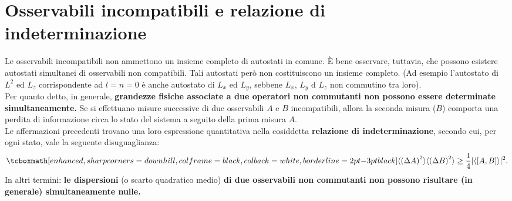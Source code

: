 \section[Osservabili incompatibili e relazione di indeterminazione]{Osservabili incompatibili e relazione di\\ indeterminazione}
Le osservabili incompatibili non ammettono un insieme completo di autostati in comune. È bene osservare, tuttavia, che possono esistere autostati simultanei di osservabili non compatibili. Tali autostati però non costituiscono un insieme completo. (Ad esempio l'autostato di $L^2$ ed $L_z$ corrispondente ad $l=n=0$ è anche autostato di $L_x$ ed $L_y$, sebbene $L_x$, $L_y$ d $L_z$ non commutino tra loro).\\

Per quanto detto, in generale, \textbf{grandezze fisiche associate a due operatori non commutanti non possono essere determinate simultaneamente.} Se si effettuano misure successive di due osservabili $A$ e $B$ incompatibili, allora la seconda misura ($B$) comporta una perdita di informazione circa lo stato del sistema a seguito della prima misura $A$.\\

Le affermazioni precedenti trovano una loro espressione quantitativa nella cosiddetta \textbf{relazione di indeterminazione}, secondo cui, per ogni stato, vale la seguente disuguaglianza:
	\begin{equation}
		\label{eq:cap4_2}
		\tcboxmath[enhanced, sharp corners=downhill, colframe=black, colback=white, borderline={2pt}{-3pt}{black}]{
			\langle \left( \Delta A \right) ^2 \rangle \langle \left( \Delta B \right) ^2 \rangle \geq\frac{1}{4}\vert \langle \left[A,B \right] \rangle \vert ^2.
			}
	\end{equation}
In altri termini: \textbf{le dispersioni} (o scarto quadratico medio) \textbf{di due osservabili non commutanti non possono risultare (in generale) simultaneamente nulle.}\\

